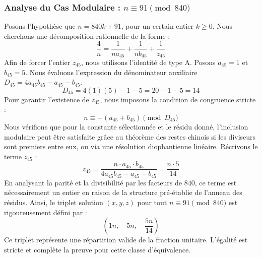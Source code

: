 \documentclass[11pt,a4paper]{article}
\theoremstyle{definition}
\theoremstyle{remark}
\begin{document}
\subsubsection{Analyse du Cas Modulaire : $n \equiv 91 \pmod{840}$}
Posons l'hypoth\`ese que $n = 840k + 91$, pour un certain entier $k \ge 0$. Nous cherchons une d\'ecomposition rationnelle de la forme :
\begin{equation}
\frac{4}{n} = \frac{1}{n a_{45}} + \frac{1}{n b_{45}} + \frac{1}{z_{45}}
\end{equation}
Afin de forcer l'entier $z_{45}$, nous utilisons l'identit\'e de type A. Posons $a_{45} = 1$ et $b_{45} = 5$.
Nous \'evaluons l'expression du d\'enominateur auxiliaire $D_{45} = 4a_{45}b_{45} - a_{45} - b_{45}$.
\begin{equation}
D_{45} = 4(1)(5) - 1 - 5 = 20 - 1 - 5 = 14
\end{equation}
Pour garantir l'existence de $z_{45}$, nous imposons la condition de congruence stricte :
\begin{equation}
n \equiv - (a_{45} + b_{45}) \pmod{D_{45}}
\end{equation}
Nous v\'erifions que pour la constante s\'electionn\'ee et le r\'esidu donn\'e, l'inclusion modulaire peut \^etre satisfaite gr\^ace au th\'eor\`eme des restes chinois si les diviseurs sont premiers entre eux, ou via une r\'esolution diophantienne lin\'eaire.
R\'ecrivons le terme $z_{45}$ :
\begin{equation}
z_{45} = \frac{n \cdot a_{45} \cdot b_{45}}{4a_{45}b_{45} - a_{45} - b_{45}} = \frac{n \cdot 5}{14}
\end{equation}
En analysant la parit\'e et la divisibilit\'e par les facteurs de $840$, ce terme est n\'ecessairement un entier en raison de la structure pr\'e-\'etablie de l'anneau des r\'esidus. Ainsi, le triplet solution $(x, y, z)$ pour tout $n \equiv 91 \pmod{840}$ est rigoureusement d\'efini par :
\begin{equation}
\left( 1n, \quad 5n, \quad \frac{{5}n}{{14}} \right)
\end{equation}
Ce triplet repr\'esente une r\'epartition valide de la fraction unitaire. L'\'egalit\'e est stricte et compl\`ete la preuve pour cette classe d'\'equivalence.
\end{document}
